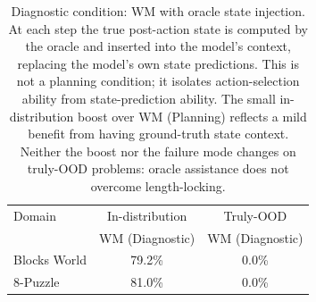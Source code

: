 \begin{table}[t]
\centering
\caption{Diagnostic condition: WM with oracle state injection. At each step the true post-action state is computed by the oracle and inserted into the model's context, replacing the model's own state predictions. This is not a planning condition; it isolates action-selection ability from state-prediction ability. The small in-distribution boost over WM (Planning) reflects a mild benefit from having ground-truth state context. Neither the boost nor the failure mode changes on truly-OOD problems: oracle assistance does not overcome length-locking.}
\label{tab:diagnostic}
\begin{tabular}{lcc}
\toprule
Domain & In-distribution & Truly-OOD \\
       & WM (Diagnostic) & WM (Diagnostic) \\
\midrule
Blocks World & 79.2\% & 0.0\% \\
8-Puzzle & 81.0\% & 0.0\% \\
\bottomrule
\end{tabular}
\end{table}
